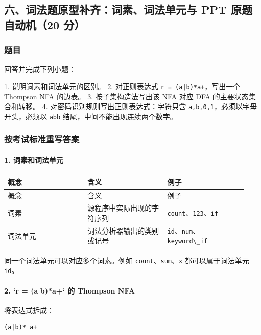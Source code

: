 \documentclass[UTF8]{ctexart}
\begin{document}
\subsection*{六、词法题原型补齐：词素、词法单元与 PPT 原题自动机（20 分）}

\subsubsection*{题目}

回答并完成下列小题：

1. 说明词素和词法单元的区别。 2. 对正则表达式 \texttt{r = (a|b)*a+}，写出一个 Thompson NFA 的边表。 3. 按子集构造法写出该 NFA 对应 DFA 的主要状态集合和转移。 4. 对密码识别规则写出正则表达式：字符只含 \texttt{a,b,0,1}，必须以字母开头，必须以 \texttt{abb} 结尾，中间不能出现连续两个数字。

\subsubsection*{按考试标准重写答案}

\paragraph*{1. 词素和词法单元}

\begin{longtable}{|p{0.31\linewidth}|p{0.31\linewidth}|p{0.31\linewidth}|}
\hline
概念 & 含义 & 例子 \\
\hline
\endfirsthead
概念 & 含义 & 例子 \\
\hline
\endhead
词素 & 源程序中实际出现的字符序列 & \texttt{count}、\texttt{123}、\texttt{if} \\
\hline
词法单元 & 词法分析器输出的类别或记号 & \texttt{id}、\texttt{num}、\texttt{keyword\textbackslash{}\_if} \\
\hline
\end{longtable}

同一个词法单元可以对应多个词素。例如 \texttt{count}、\texttt{sum}、\texttt{x} 都可以属于词法单元 \texttt{id}。

\paragraph*{2. `r = (a|b)*a+` 的 Thompson NFA}

将表达式拆成：

\begin{Verbatim}[fontsize=\small,breaklines=true]
(a|b)* a+
\end{Verbatim}
\end{document}
